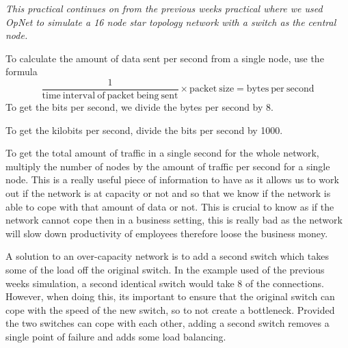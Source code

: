 \textit{This practical continues on from the previous weeks practical where we used OpNet to simulate a 16 node star topology network with a switch as the central node.}

To calculate the amount of data sent per second from a single node, use the formula
\[\frac{1}{\mathrm{time\ interval\ of\ packet\ being\ sent}} \times \mathrm{packet\ size} = \mathrm{bytes\ per\ second}\]
To get the bits per second, we divide the bytes per second by 8.

To get the kilobits per second, divide the bits per second by 1000.

To get the total amount of traffic in a single second for the whole network, multiply the number of nodes by the amount of traffic per second for a single node. This is a really useful piece of information to have as it allows us to work out if the network is at capacity or not and so that we know if the network is able to cope with that amount of data or not. This is crucial to know as if the network cannot cope then in a business setting, this is really bad as the network will slow down productivity of employees therefore loose the business money.

A solution to an over-capacity network is to add a second switch which takes some of the load off the original switch. In the example used of the previous weeks simulation, a second identical switch would take 8 of the connections. However, when doing this, its important to ensure that the original switch can cope with the speed of the new switch, so to not create a bottleneck. Provided the two switches can cope with each other, adding a second switch removes a single point of failure and adds some load balancing.